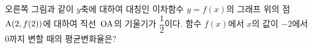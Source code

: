 \noindent\begin{minipage}[t]{0.58\linewidth}\vspace{0pt}\raggedright 오른쪽 그림과 같이 $y$축에 대하여 대칭인 이차함수 $y=f(x)$의 그래프 위의 점~$\mathrm{A}(2{,}\mkern3mu\mathopen{}f(2))$에 대하여 직선~$\mathrm{OA}$의 기울기가 $\dfrac{1}{2}$이다. 함수 $f(x)$에서 $x$의 값이 $-2$에서 $0$까지 변할 때의 평균변화율은? \end{minipage}\hfill\begin{minipage}[t]{0.4\linewidth}\vspace{0pt}\centering \resizebox{\ifdim\width>\linewidth\linewidth\else\width\fi}{!}{}\end{minipage}\par
{}
